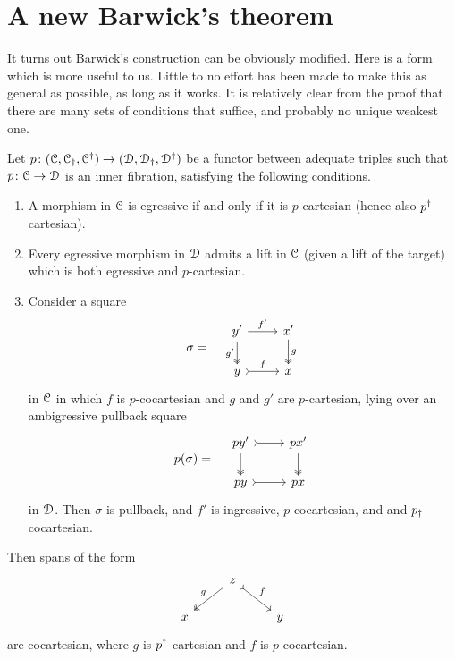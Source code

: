 \documentclass[main.tex]{subfiles}
\begin{document}
\section{A new Barwick's theorem}
\label{sec:a_new_barwick_s_theorem}

It turns out Barwick's construction can be obviously modified. Here is a form which is more useful to us. Little to no effort has been made to make this as general as possible, as long as it works. It is relatively clear from the proof that there are many sets of conditions that suffice, and probably no unique weakest one.

\begin{theorem}
  Let $p\colon (\mathcal{C}, \mathcal{C}_{\dagger}, \mathcal{C}^{\dagger}) \to (\mathcal{D}, \mathcal{D}_{\dagger}, \mathcal{D}^{\dagger})$ be a functor between adequate triples such that $p\colon \mathcal{C} \to \mathcal{D}$ is an inner fibration, satisfying the following conditions.
  \begin{enumerate}
    \item A morphism in $\mathcal{C}$ is egressive if and only if it is $p$-cartesian (hence also $p^{\dagger}$-cartesian).

    \item Every egressive morphism in $\mathcal{D}$ admits a lift in $\mathcal{C}$ (given a lift of the target) which is both egressive and $p$-cartesian.

    \item Consider a square
      \begin{equation*}
          \sigma = \quad
          \begin{tikzcd}
            y'
            \arrow[r, "f'"]
            \arrow[d, two heads, swap, "g'"]
            & x'
            \arrow[d, two heads, "g"]
            \\
            y
            \arrow[r, rightarrowtail, "f"]
            & x
          \end{tikzcd}
      \end{equation*}
      in $\mathcal{C}$ in which $f$ is $p$-cocartesian and $g$ and $g'$ are $p$-cartesian, lying over an ambigressive pullback square
      \begin{equation*}
        p(\sigma) = \quad
        \begin{tikzcd}
          py'
          \arrow[r, rightarrowtail]
          \arrow[d, two heads]
          & px'
          \arrow[d, two heads]
          \\
          py
          \arrow[r, rightarrowtail]
          & px
        \end{tikzcd}
      \end{equation*}
      in $\mathcal{D}$. Then $\sigma$ is pullback, and $f'$ is ingressive, $p$-cocartesian, and and $p_{\dagger}$-cocartesian.
  \end{enumerate}
  Then spans of the form
  \begin{equation*}
    \begin{tikzcd}
      & z
      \arrow[dl, two heads, swap, "g"]
      \arrow[dr, rightarrowtail, "f"]
      \\
      x
      && y
    \end{tikzcd}
  \end{equation*}
  are cocartesian, where $g$ is $p^{\dagger}$-cartesian and $f$ is $p$-cocartesian.
\end{theorem}
\end{document}
